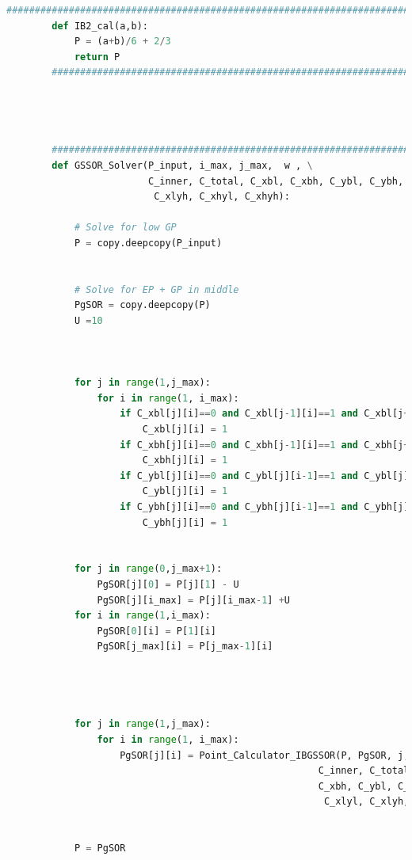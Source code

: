 \documentclass[12pt]{article}
\begin{document}
\begin{scriptsize}
\begin{lstlisting}[language=python,caption={Python code-Potential Flow}]
        ##########################################################################################
        def IB2_cal(a,b):
            P = (a+b)/6 + 2/3
            return P
        ##########################################################################################
            
        
        
        
        ##########################################################################################
        def GSSOR_Solver(P_input, i_max, j_max,  w , \
                         C_inner, C_total, C_xbl, C_xbh, C_ybl, C_ybh, C_edge, C_xlyl,\ 
                          C_xlyh, C_xhyl, C_xhyh):
        
            # Solve for low GP
            P = copy.deepcopy(P_input)
            
        
            # Solve for EP + GP in middle
            PgSOR = copy.deepcopy(P)
            U =10
        
        
        
            for j in range(1,j_max):
                for i in range(1, i_max):
                    if C_xbl[j][i]==0 and C_xbl[j-1][i]==1 and C_xbl[j+1][i]==1:
                        C_xbl[j][i] = 1
                    if C_xbh[j][i]==0 and C_xbh[j-1][i]==1 and C_xbh[j+1][i]==1:
                        C_xbh[j][i] = 1
                    if C_ybl[j][i]==0 and C_ybl[j][i-1]==1 and C_ybl[j][i+1]==1:
                        C_ybl[j][i] = 1
                    if C_ybh[j][i]==0 and C_ybh[j][i-1]==1 and C_ybh[j][i+1]==1:
                        C_ybh[j][i] = 1
            
        
            for j in range(0,j_max+1):
                PgSOR[j][0] = P[j][1] - U
                PgSOR[j][i_max] = P[j][i_max-1] +U
            for i in range(1,i_max):
                PgSOR[0][i] = P[1][i] 
                PgSOR[j_max][i] = P[j_max-1][i]
        
        
            
        
            for j in range(1,j_max):
                for i in range(1, i_max):
                    PgSOR[j][i] = Point_Calculator_IBGSSOR(P, PgSOR, j, i, w,\
                                                       C_inner, C_total, C_xbl, \ 
                                                       C_xbh, C_ybl, C_ybh, C_edge,\
                                                        C_xlyl, C_xlyh, C_xhyl, C_xhyh)
            
            
            P = PgSOR
        

\end{lstlisting}
\end{scriptsize}
\end{document}
